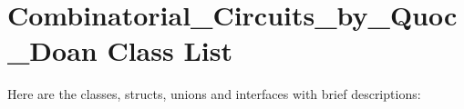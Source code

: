 \section{Combinatorial\_\-Circuits\_\-by\_\-Quoc\_\-Doan Class List}
Here are the classes, structs, unions and interfaces with brief descriptions:\begin{CompactList}
\item{}
\item{}
\item{}
\item{}
\item{}
\end{CompactList}
